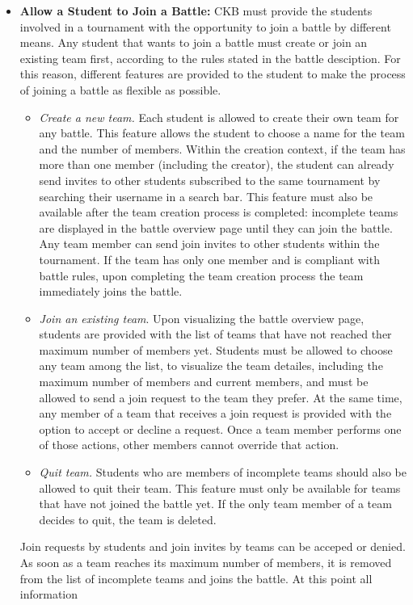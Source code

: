 \documentclass[a4paper, 11pt, titlepage]{article}
\begin{document}
\begin{itemize}
    \item \textbf{Allow a Student to Join a Battle:} CKB must provide the students involved in a tournament with the opportunity to join a battle by different means. 
    Any student that wants to join a battle must create or join an existing team first, according to the rules stated in the battle desciption. For this reason, different features are provided to the student to make the process of joining a battle as flexible as possible.
    \begin{itemize}
        \item \textit{Create a new team.} Each student is allowed to create their own team for any battle. This feature allows the student to choose a name for the team and the number of members. Within the creation context,
        if the team has more than one member (including the creator), the student can already send invites to other students subscribed to the same tournament by searching their username in a search bar. This feature must also be available after the team creation process is completed: 
        incomplete teams are displayed in the battle overview page until they can join the battle. 
        Any team member can send join invites to other students within the tournament. If the team has only one member and is compliant with battle rules, upon completing the 
        team creation process the team immediately joins the battle.
        \item \textit{Join an existing team}. Upon visualizing the battle overview page, students are provided with the list of teams that have not reached ther maximum number of members yet. Students must be allowed to choose any team among the list,
        to visualize the team detailes, including the maximum number of members and current members, and must be allowed to send a join request to the team they prefer. At the same time, any member of a team that receives a join request is provided with the option to accept or decline a request. 
        Once a team member performs one of those actions, other members cannot override that action.   
        \item \textit{Quit team.} Students who are members of incomplete teams should also be allowed to quit their team. This feature must only be available for teams that have not joined the battle yet.
        If the only team member of a team decides to quit, the team is deleted. 
    \end{itemize}
    Join requests by students and join invites by teams can be acceped or denied. As soon as a team reaches its maximum number of members, it is removed from the list of incomplete teams and joins the battle. At this point all information 

\end{itemize}
\end{document}
